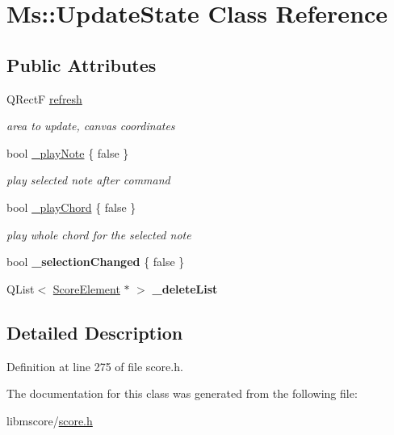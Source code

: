 \hypertarget{class_ms_1_1_update_state}{}\section{Ms\+:\+:Update\+State Class Reference}
\label{class_ms_1_1_update_state}
\subsection*{Public Attributes}
\begin{DoxyCompactItemize}
\item 
\mbox{\label{class_ms_1_1_update_state_a5b275722049930f65fe701d667169b90}} 
Q\+RectF \hyperlink{class_ms_1_1_update_state_a5b275722049930f65fe701d667169b90}{refresh}
\begin{DoxyCompactList}\small\item\em area to update, canvas coordinates \end{DoxyCompactList}\item 
\mbox{\label{class_ms_1_1_update_state_a3cd53a0b52af34eb210ff8f9c618993f}} 
bool \hyperlink{class_ms_1_1_update_state_a3cd53a0b52af34eb210ff8f9c618993f}{\+\_\+play\+Note} \{ false \}
\begin{DoxyCompactList}\small\item\em play selected note after command \end{DoxyCompactList}\item 
\mbox{\label{class_ms_1_1_update_state_a14fe94853872d3ef379ab0cdce84c040}} 
bool \hyperlink{class_ms_1_1_update_state_a14fe94853872d3ef379ab0cdce84c040}{\+\_\+play\+Chord} \{ false \}
\begin{DoxyCompactList}\small\item\em play whole chord for the selected note \end{DoxyCompactList}\item 
\mbox{\label{class_ms_1_1_update_state_aabd4d9889d263bdf7263df6b43b28794}} 
bool {\bfseries \+\_\+selection\+Changed} \{ false \}
\item 
\mbox{\label{class_ms_1_1_update_state_aa240636bdb445c9a69997a6366558169}} 
Q\+List$<$ \hyperlink{class_ms_1_1_score_element}{Score\+Element} $\ast$ $>$ {\bfseries \+\_\+delete\+List}
\end{DoxyCompactItemize}


\subsection{Detailed Description}


Definition at line 275 of file score.\+h.



The documentation for this class was generated from the following file\+:\begin{DoxyCompactItemize}
\item 
libmscore/\hyperlink{score_8h}{score.\+h}\end{DoxyCompactItemize}
